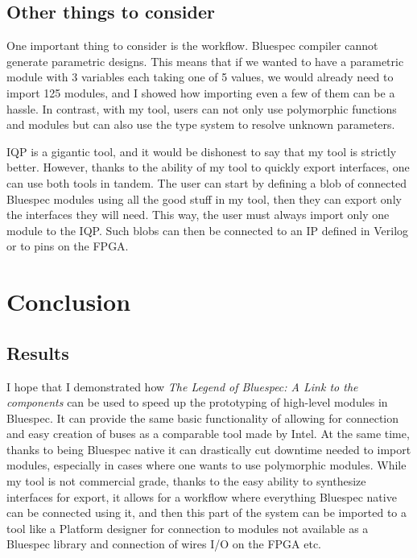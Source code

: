 \documentclass[12pt]{report}
\begin{document}
\section{Other things to consider} 
One important thing to consider is the workflow. Bluespec compiler cannot generate parametric designs. This means that if we wanted to have a parametric module with 3 variables each taking one of 5 values, we would already need to import 125 modules, and I showed how importing even a few of them can be a hassle. In contrast, with my tool, users can not only use polymorphic functions and modules but can also use the type system to resolve unknown parameters. 
\par 
IQP is a gigantic tool, and it would be dishonest to say that my tool is strictly better. However, thanks to the ability of my tool to quickly export interfaces, one can use both tools in tandem. The user can start by defining a blob of connected Bluespec modules using all the good stuff in my tool, then they can export only the interfaces they will need. This way, the user must always import only one module to the IQP. Such blobs can then be connected to an IP defined in Verilog or to pins on the FPGA.  
\chapter{Conclusion} 
\section{Results} 
I hope that I demonstrated how \emph{The Legend of Bluespec: A Link to the components} can be used to speed up the prototyping of high-level modules in Bluespec. It can provide the same basic functionality of allowing for connection and easy creation of buses as a comparable tool made by Intel. At the same time, thanks to being Bluespec native it can drastically cut downtime needed to import modules, especially in cases where one wants to use polymorphic modules. While my tool is not commercial grade, thanks to the easy ability to synthesize interfaces for export, it allows for a workflow where everything Bluespec native can be connected using it, and then this part of the system can be imported to a tool like a Platform designer for connection to modules not available as a Bluespec library and connection of wires I/O on the FPGA etc. 
\end{document}
